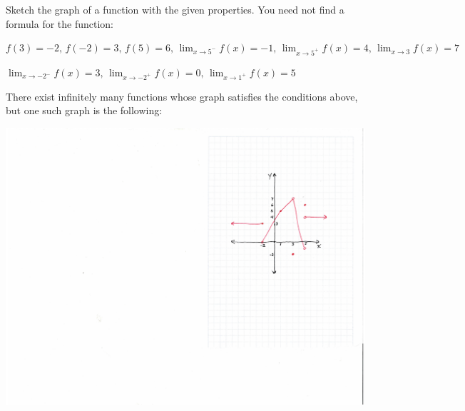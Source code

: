 \documentclass[nooutcomes]{ximera}
\begin{document}
	
\begin{problem}
Sketch the graph of a function with the given properties.  You need not find a formula for the function:
	
	$ f(3) = -2, \, f(-2) = 3, \, f(5) = 6, \, \lim_{x \to 5^-} f(x) = -1, \, \lim_{x \to 5^+} f(x) = 4, \, \lim_{x \to 3} f(x) = 7  $
	
	$ \lim_{x \to -2^-} f(x) = 3, \, \lim_{x \to -2^+} f(x) = 0, \, \lim_{x \to 1^+} f(x) = 5  $
	
	\begin{freeResponse}
	There exist infinitely many functions whose graph satisfies the conditions above, but one such graph is the following:
	
\newpage
	
		\begin{image}
		\includegraphics[trim= 450 620 10 0]{Figure3.pdf}
		\end{image}
	\end{freeResponse}
\end{problem}
	










								
				
				
	
\end{document}

